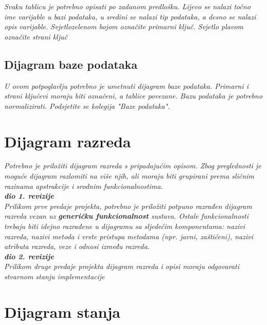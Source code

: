 				\textit{Svaku tablicu je potrebno opisati po zadanom predlošku. Lijevo se nalazi točno ime varijable u bazi podataka, u sredini se nalazi tip podataka, a desno se nalazi opis varijable. Svjetlozelenom bojom označite primarni ključ. Svjetlo plavom označite strani ključ}
				
			
			\subsection{Dijagram baze podataka}
				\textit{ U ovom potpoglavlju potrebno je umetnuti dijagram baze podataka. Primarni i strani ključevi moraju biti označeni, a tablice povezane. Bazu podataka je potrebno normalizirati. Podsjetite se kolegija "Baze podataka".}
			
			\eject
			
		\section{Dijagram razreda}
		
			\textit{Potrebno je priložiti dijagram razreda s pripadajućim opisom. Zbog preglednosti je moguće dijagram razlomiti na više njih, ali moraju biti grupirani prema sličnim razinama apstrakcije i srodnim funkcionalnostima.}\\
			
			\textbf{\textit{dio 1. revizije}}\\
			
			\textit{Prilikom prve predaje projekta, potrebno je priložiti potpuno razrađen dijagram razreda vezan uz \textbf{generičku funkcionalnost} sustava. Ostale funkcionalnosti trebaju biti idejno razrađene u dijagramu sa sljedećim komponentama: nazivi razreda, nazivi metoda i vrste pristupa metodama (npr. javni, zaštićeni), nazivi atributa razreda, veze i odnosi između razreda.}\\
			
			\textbf{\textit{dio 2. revizije}}\\			
			
			\textit{Prilikom druge predaje projekta dijagram razreda i opisi moraju odgovarati stvarnom stanju implementacije}
			
			
			
			\eject
		
		\section{Dijagram stanja}
			
